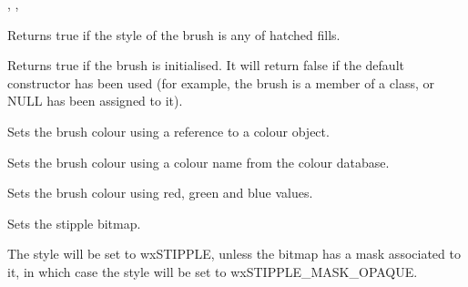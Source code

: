 
, ,\rtfsp
{}

\label{wxbrushishatch}


Returns true if the style of the brush is any of hatched fills.



\label{wxbrushok}


Returns true if the brush is initialised. It will return false if the default
constructor has been used (for example, the brush is a member of a class, or
NULL has been assigned to it).

\label{wxbrushsetcolour}


Sets the brush colour using a reference to a colour object.


Sets the brush colour using a colour name from the colour database.


Sets the brush colour using red, green and blue values.



\label{wxbrushsetstipple}


Sets the stipple bitmap.




The style will be set to wxSTIPPLE, unless the bitmap has a mask associated
to it, in which case the style will be set to wxSTIPPLE\_MASK\_OPAQUE.

